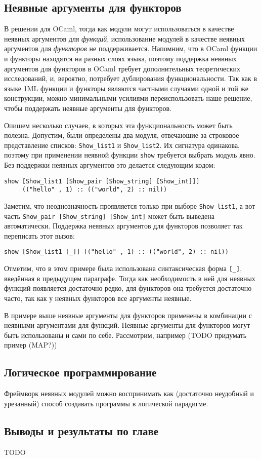 \documentclass[../diploma.tex]{subfiles}
\begin{document}
\subsection{Неявные аргументы для функторов}

В решении для OCaml, тогда как модули могут использоваться в качестве неявных аргументов для \textit{функций}, использование модулей в качестве неявных аргументов для \textit{функторов} не поддерживается. Напомним, что в OCaml функции и функторы находятся на разных слоях языка, поэтому поддержка неявных аргументов для функторов в OCaml требует дополнительных теоретических исследований, и, вероятно, потребует дублирования функциональности. Так как в языке 1ML функции и функторы являются частными случаями одной и той же конструкции, можно минимальными усилиями переиспользовать наше решение, чтобы поддержать неявные аргументы для функторов.

Опишем несколько случаев, в которых эта функциональность может быть полезна. Допустим, были определены два модуля, отвечаюшие за строковое представление списков: \texttt{Show_list1} и \texttt{Show_list2}. Их сигнатура одинакова, поэтому при применении неявной функции \texttt{show} требуется выбрать модуль явно. Без поддержки неявных аргументов это делается следующим кодом:

\begin{verbatim}
show [Show_list1 [Show_pair [Show_string] [Show_int]]]
     (("hello" , 1) :: (("world", 2) :: nil))
\end{verbatim}

Заметим, что неоднозначность проявляется только при выборе \texttt{Show_list1}, а вот часть \texttt{Show_pair [Show_string] [Show_int]} может быть выведена автоматически. Поддержка неявных аргументов для функторов позволяет так переписать этот вызов:

\begin{verbatim}
show [Show_list1 [_]] (("hello" , 1) :: (("world", 2) :: nil))
\end{verbatim}

Отметим, что в этом примере была использована синтаксическая форма \texttt{[_]}, введённая в предыдущем параграфе. Тогда как необходимость в ней для неявных функций появляется достаточно редко, для функторов она требуется достаточно часто, так как у неявных функторов все аргументы неявные.

В примере выше неявные аргументы для функторов применены в комбинации с неявными аргументами для функций. Неявные аргументы для функторов могут быть использованы и сами по себе. Рассмотрим, например (TODO придумать пример (MAP?))

\subsection{Логическое программирование}

Фреймворк неявных модулей можно воспринимать как (достаточно неудобный и урезанный) способ создавать программы в логической парадигме. 

\subsection{Выводы и результаты по главе}

TODO
\end{document}
